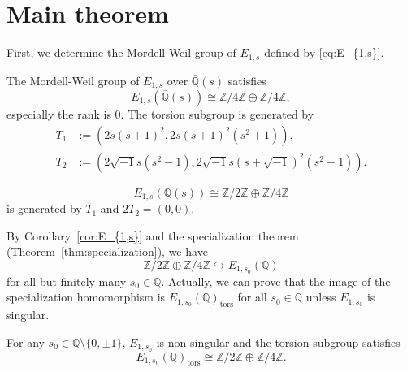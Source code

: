 \documentclass[main]{subfiles}
\begin{document}
\section{Main theorem}
First, we determine the Mordell-Weil group of $E_{1,s}$ defined by \eqref{eq:E_{1,s}}.

\begin{thm}
    \label{thm:E_{1,s}}
    The Mordell-Weil group of $E_{1,s}$ over $\overline{\mathbb{Q}}(s)$ satisfies
    \begin{equation*}
        E_{1,s}(\overline{\mathbb{Q}}(s)) \cong \mathbb{Z} / 4 \mathbb{Z} \oplus \mathbb{Z} / 4 \mathbb{Z},
    \end{equation*}
    especially the rank is $0$. The torsion subgroup is generated by
    \begin{align*}
        T_1 & := (2s(s+1)^2, 2s(s+1)^2(s^2+1)),                              \\
        T_2 & := (2 \sqrt{-1} s(s^2-1),2 \sqrt{-1} s(s+\sqrt{-1})^2(s^2-1)).
    \end{align*}
\end{thm}

\begin{cor}
    \label{cor:E_{1,s}}
    \begin{equation*}
        E_{1,s}(\mathbb{Q}(s)) \cong \mathbb{Z} / 2 \mathbb{Z} \oplus \mathbb{Z} / 4 \mathbb{Z}
    \end{equation*}
    is generated by $T_1$ and $2T_2=(0,0)$.
\end{cor}

By Corollary~\ref{cor:E_{1,s}} and the specialization theorem (Theorem~\ref{thm:specialization}), we have
\begin{equation}
    \label{eq:specialization}
    \mathbb{Z} / 2 \mathbb{Z} \oplus \mathbb{Z} / 4 \mathbb{Z} \hookrightarrow E_{1,s_{0}}(\mathbb{Q})
\end{equation}
%
for all but finitely many $s_0 \in \mathbb{Q}$.
Actually, we can prove that the image of the specialization homomorphism is $E_{1,s_0}(\mathbb{Q})_{\text{tors}}$ for all $s_0 \in \mathbb{Q}$ unless $E_{1,s_0}$ is singular.

\begin{thm}
    \label{thm:E_{1,s_0}}
    For any $s_0 \in \mathbb{Q} \setminus \{0,\pm 1 \}$, $E_{1,s_0}$ is non-singular and the torsion subgroup satisfies
    \begin{equation*}
        E_{1,s_{0}}(\mathbb{Q})_{\text{tors}} \cong \mathbb{Z} / 2 \mathbb{Z} \oplus \mathbb{Z} / 4 \mathbb{Z}.
    \end{equation*}
\end{thm}
\end{document}
